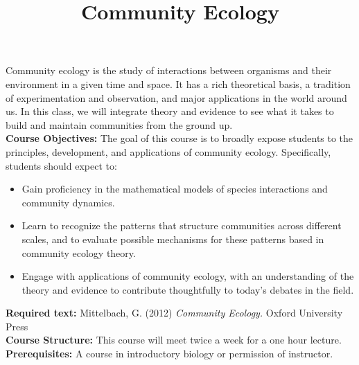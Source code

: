 \documentclass[12pt]{article}\usepackage[]{graphicx}\usepackage[]{color}
\begin{document}
\title{Community Ecology}
\date{}
\maketitle{}
Community ecology is the study of interactions between organisms and their environment in a given time and space. It has a rich theoretical basis, a tradition of experimentation and observation, and major applications in the world around us. In this class, we will integrate theory and evidence to see what it takes to build and maintain communities from the ground up. \\

\textbf{Course Objectives:} The goal of this course is to broadly expose students to the principles, development, and applications of community ecology. Specifically, students should expect to:
\begin{itemize}
\item Gain proficiency in the mathematical models of species interactions and community dynamics.
\item Learn to recognize the patterns that structure communities across different scales, and to evaluate possible mechanisms for these patterns based in community ecology theory.
\item Engage with applications of community ecology, with an understanding of the theory and evidence to contribute thoughtfully to today's debates in the field.
\end{itemize}
\textbf{Required text:} Mittelbach, G. (2012) \textit{Community Ecology.} Oxford University Press \\
\textbf{Course Structure:} This course will meet twice a week for a one hour lecture.\\
\textbf{Prerequisites:} A course in introductory biology or permission of instructor.\\
\end{document}
